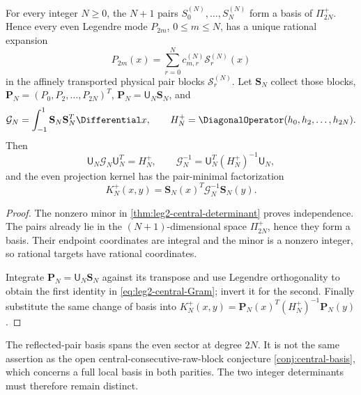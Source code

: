 \begin{corollary}
\label{cor:leg2-central-basis}
For every integer $N\ge0$, the $N+1$ pairs
$S_0^{(N)},\ldots,S_N^{(N)}$ form a basis of
$\Pi_{2N}^+$.  Hence every even Legendre mode $P_{2m}$, $0\le m\le N$, has a
unique rational expansion
\begin{equation}
 P_{2m}(x)=\sum_{r=0}^{N}c_{m,r}^{(N)}\mathcal S_r^{(N)}(x)
 \label{eq:leg2-central-legendre}
\end{equation}
in the affinely transported physical pair blocks $\mathcal S_r^{(N)}$.
Let $\mathbf S_N$ collect those blocks,
$\mathbf P_N=(P_0,P_2,\ldots,P_{2N})^T$,
$\mathbf P_N=\mathsf U_N\mathbf S_N$, and
\[
 \mathcal G_N=\int_{-1}^{1}\mathbf S_N\mathbf S_N^T\Differential x,
 \qquad
 H_N^+=\DiagonalOperator(h_0,h_2,\ldots,h_{2N}).
\]
Then
\begin{equation}
 \boxed{\mathsf U_N\mathcal G_N\mathsf U_N^T=H_N^+,
 \qquad
 \mathcal G_N^{-1}=\mathsf U_N^T(H_N^+)^{-1}\mathsf U_N,}
 \label{eq:leg2-central-Gram}
\end{equation}
and the even projection kernel has the pair-minimal factorization
\begin{equation}
 K_N^+(x,y)=\mathbf S_N(x)^T\mathcal G_N^{-1}\mathbf S_N(y).
 \label{eq:leg2-central-kernel}
\end{equation}
\end{corollary}

\begin{proof}
The nonzero minor in \cref{thm:leg2-central-determinant} proves independence.
The pairs already lie in the $(N+1)$-dimensional space $\Pi_{2N}^+$, hence
they form a basis.  Their endpoint coordinates are integral and the minor is
a nonzero integer, so rational targets have rational coordinates.

Integrate $\mathbf P_N=\mathsf U_N\mathbf S_N$ against its transpose and use
Legendre orthogonality to obtain the first identity in
\eqref{eq:leg2-central-Gram}; invert it for the second.  Finally substitute
the same change of basis into
$K_N^+(x,y)=\mathbf P_N(x)^T(H_N^+)^{-1}\mathbf P_N(y)$.
\end{proof}

\begin{remark}
The reflected-pair basis spans the even sector at degree $2N$.  It is not the
same assertion as the open central-consecutive-raw-block conjecture
\ref{conj:central-basis}, which concerns a full local basis in both parities.
The two integer determinants must therefore remain distinct.
\end{remark}

